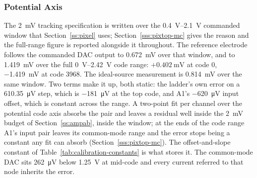 
\subsubsection{Potential Axis}\label{sss:pixtop-potential}

The \SI{2}{\milli\volt} tracking specification is written over the
\SIrange{0.4}{2.1}{\volt} commanded window that Section~\ref{ss:pixel} uses;
Section~\ref{sss:pixtop-mc} gives the reason and the full-range figure is
reported alongside it throughout. The reference electrode follows the commanded
DAC output to \SI{0.672}{\milli\volt} over that window, and to
\SI{1.419}{\milli\volt} over the full \SIrange{0}{2.42}{\volt} code range:
\(+\SI{0.402}{\milli\volt}\) at code 0, \SI{-1.419}{\milli\volt} at code 3968.
The ideal-source measurement is
\SI{0.814}{\milli\volt} over the same window. Two terms make it up, both
static: the ladder's own error on a \SI{610.35}{\micro\volt} step, which is
\SI{-181}{\micro\volt} at the top code, and A1's \SI{-620}{\micro\volt} input
offset, which is constant across the range. A two-point fit per channel over
the potential code axis absorbs the pair and leaves a residual well inside the
\SI{2}{\milli\volt} budget of Section~\ref{ss:ampab}, inside the window; at
the ends of the code range A1's input pair leaves its common-mode range and the
error stops being a constant any fit can absorb
(Section~\ref{sss:pixtop-mc}). The offset-and-slope
constant of Table~\ref{tab:calibration-constants} is what stores it. The
common-mode DAC sits \SI{262}{\micro\volt} below \SI{1.25}{\volt} at mid-code
and every current referred to that node inherits the error.

